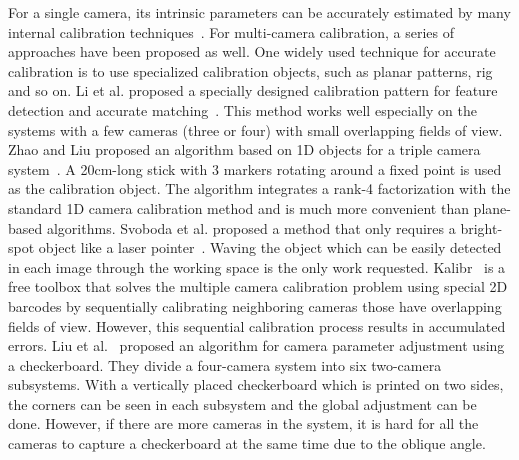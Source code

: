 For a single camera, its intrinsic parameters can be accurately estimated by many internal calibration techniques~\cite{zhang2000flexible,zhang2004camera}.
For multi-camera calibration, a series of approaches have been proposed as well.
One widely used technique for accurate calibration is to use specialized calibration objects, such as planar patterns, rig and so on.
%
Li et al. proposed a specially designed calibration pattern for feature detection and accurate matching~\cite{Li2013A}. %
This method works well especially on the systems with a few cameras (three or four) with small overlapping fields of view.
%
Zhao and Liu proposed an algorithm based on 1D objects for a triple camera system~\cite{zhao2008practical}.
A 20cm-long stick with 3 markers rotating around a fixed point is used as the calibration object.
The algorithm integrates a rank-4 factorization with the standard 1D camera calibration method and is much more convenient than plane-based algorithms.
Svoboda et al. proposed a method that only requires a bright-spot object like a laser pointer~\cite{svoboda2005convenient}.
Waving the object which can be easily detected in each image through the working space is the only work requested.
%
Kalibr~\cite{Maye2013Self} is a free toolbox that solves the multiple camera calibration problem using special 2D barcodes by sequentially calibrating neighboring cameras those have overlapping fields of view.
%
However, this sequential calibration process results in accumulated errors.
%
Liu et al.~\cite{Liu2015Algorithm} proposed an algorithm for camera parameter adjustment using a checkerboard. They divide a four-camera system into six two-camera subsystems. With a vertically placed checkerboard which is printed on two sides, the corners can be seen in each subsystem and the global adjustment can be done. 
However, if there are more cameras in the system, it is hard for all the cameras to capture a checkerboard at the same time due to the oblique angle.



